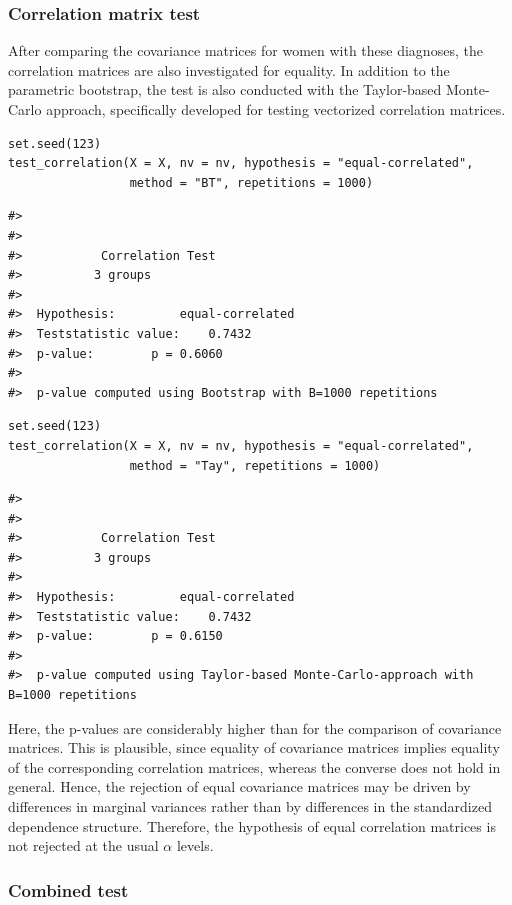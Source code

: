 \subsubsection{Correlation matrix test}\label{correlation-matrix-test}

After comparing the covariance matrices for women with these diagnoses, the correlation matrices are also investigated for equality. In addition to the parametric bootstrap, the test is also conducted with the Taylor-based Monte-Carlo approach, specifically developed for testing vectorized correlation matrices.

\begin{verbatim}
set.seed(123)
test_correlation(X = X, nv = nv, hypothesis = "equal-correlated",
                 method = "BT", repetitions = 1000)
\end{verbatim}

\begin{verbatim}
#> 
#> 
#>           Correlation Test 
#>          3 groups
#> 
#>  Hypothesis:         equal-correlated
#>  Teststatistic value:    0.7432
#>  p-value:        p = 0.6060
#>  
#>  p-value computed using Bootstrap with B=1000 repetitions
\end{verbatim}

\begin{verbatim}
set.seed(123)
test_correlation(X = X, nv = nv, hypothesis = "equal-correlated",
                 method = "Tay", repetitions = 1000)
\end{verbatim}

\begin{verbatim}
#> 
#> 
#>           Correlation Test 
#>          3 groups
#> 
#>  Hypothesis:         equal-correlated
#>  Teststatistic value:    0.7432
#>  p-value:        p = 0.6150
#>  
#>  p-value computed using Taylor-based Monte-Carlo-approach with B=1000 repetitions
\end{verbatim}

Here, the p-values are considerably higher than for the comparison of covariance matrices. This is plausible, since equality of covariance matrices implies equality of the corresponding correlation matrices, whereas the converse does not hold in general. Hence, the rejection of equal covariance matrices may be driven by differences in marginal variances rather than by differences in the standardized dependence structure. Therefore, the hypothesis of equal correlation matrices is not rejected at the usual \(\alpha\) levels.

\subsubsection{Combined test}\label{combined-test}

